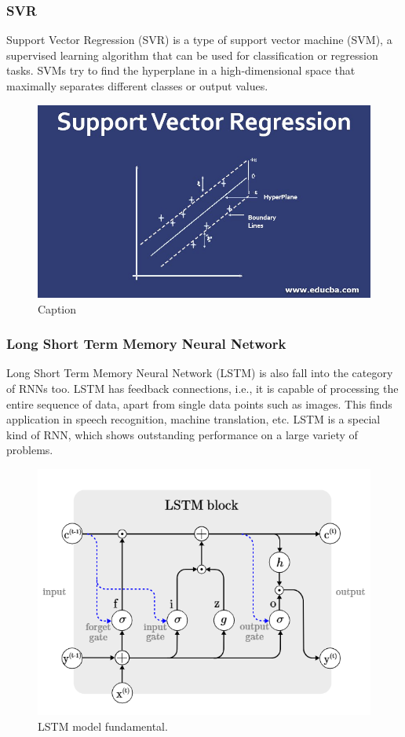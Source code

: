 \documentclass{ieeeojies}
\begin{document}
\subsubsection{SVR}
Support Vector Regression (SVR) is a type of support vector machine (SVM), a supervised learning algorithm that can be used for classification or regression tasks. SVMs try to find the hyperplane in a high-dimensional space that maximally separates different classes or output values.
\begin{figure}[H]
    \centering
    \includegraphics[width=0.8\linewidth]{SVR S.jpg}
    \caption{Caption}
    \label{fig:enter-label}
\end{figure}
\subsubsection{Long Short Term Memory Neural Network}
Long Short Term Memory Neural Network (LSTM) is also fall into the category of RNNs too. LSTM has feedback connections, i.e., it is capable of processing the entire sequence of data, apart from single data points such as images. This finds application in speech recognition, machine translation, etc. LSTM is a special kind of RNN, which shows outstanding performance on a large variety of problems.\cite{a4}

\begin{figure}[H]
    \centering
    \includegraphics[width=0.8\linewidth]{LSTM.PNG}
    \caption{LSTM model fundamental.}
    \label{fig:example}
\end{figure}
\end{document}
